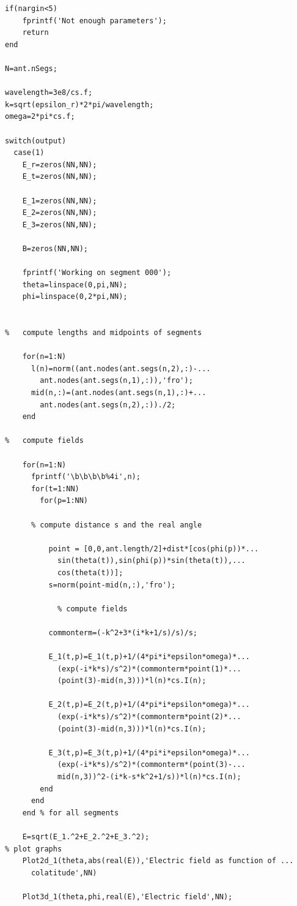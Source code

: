 \documentclass[a4paper,11pt]{thesis}
\begin{document}
\begin{verbatim}
if(nargin<5)
    fprintf('Not enough parameters');
    return
end

N=ant.nSegs;

wavelength=3e8/cs.f;
k=sqrt(epsilon_r)*2*pi/wavelength;
omega=2*pi*cs.f;

switch(output)
  case(1)
    E_r=zeros(NN,NN);
    E_t=zeros(NN,NN);

    E_1=zeros(NN,NN);
    E_2=zeros(NN,NN);
    E_3=zeros(NN,NN);

    B=zeros(NN,NN);

    fprintf('Working on segment 000');
    theta=linspace(0,pi,NN);
    phi=linspace(0,2*pi,NN);


%   compute lengths and midpoints of segments

    for(n=1:N)
      l(n)=norm((ant.nodes(ant.segs(n,2),:)-...
        ant.nodes(ant.segs(n,1),:)),'fro');
      mid(n,:)=(ant.nodes(ant.segs(n,1),:)+...
        ant.nodes(ant.segs(n,2),:))./2;
    end

%   compute fields

    for(n=1:N)
      fprintf('\b\b\b\b%4i',n);
      for(t=1:NN)
        for(p=1:NN)

	  % compute distance s and the real angle

          point = [0,0,ant.length/2]+dist*[cos(phi(p))*...
            sin(theta(t)),sin(phi(p))*sin(theta(t)),...
            cos(theta(t))];
          s=norm(point-mid(n,:),'fro');

            % compute fields

          commonterm=(-k^2+3*(i*k+1/s)/s)/s;

          E_1(t,p)=E_1(t,p)+1/(4*pi*i*epsilon*omega)*...
            (exp(-i*k*s)/s^2)*(commonterm*point(1)*...
            (point(3)-mid(n,3)))*l(n)*cs.I(n);

          E_2(t,p)=E_2(t,p)+1/(4*pi*i*epsilon*omega)*...
            (exp(-i*k*s)/s^2)*(commonterm*point(2)*...
            (point(3)-mid(n,3)))*l(n)*cs.I(n);

          E_3(t,p)=E_3(t,p)+1/(4*pi*i*epsilon*omega)*...
            (exp(-i*k*s)/s^2)*(commonterm*(point(3)-...
            mid(n,3))^2-(i*k-s*k^2+1/s))*l(n)*cs.I(n);
        end
      end
    end % for all segments

    E=sqrt(E_1.^2+E_2.^2+E_3.^2);
% plot graphs
    Plot2d_1(theta,abs(real(E)),'Electric field as function of ...
      colatitude',NN)

    Plot3d_1(theta,phi,real(E),'Electric field',NN);


\end{verbatim}
\end{document}
